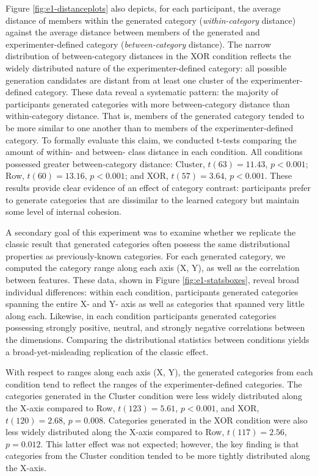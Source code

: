 \documentclass[12pt]{article}
\begin{document}
\begin{flushleft}
Figure \ref{fig:e1-distanceplots} also depicts, for each participant, the average distance of members within the generated category ({\em within-category} distance) against the average distance between members of the generated and experimenter-defined category ({\em between-category} distance). The narrow distribution of between-category distances in the XOR condition reflects the widely distributed nature of the experimenter-defined category: all possible generation candidates are distant from at least one cluster of the experimenter-defined category. These data reveal a systematic pattern: the majority of participants generated categories with more between-category distance than within-category distance. That is, members of the generated category tended to be more similar to one another than to members of the experimenter-defined category. To formally evaluate this claim, we conducted t-tests comparing the amount of within- and between- class distance in each condition. All conditions possessed greater between-category distance: Cluster, $t(63) = 11.43$, $p < 0.001$; Row, $t(60) = 13.16$, $p < 0.001$; and XOR, $t(57) = 3.64$, $p < 0.001$.  These results provide clear evidence of an effect of category contrast: participants prefer to generate categories that are dissimilar to the learned category but maintain some level of internal cohesion. 

A secondary goal of this experiment was to examine whether we replicate the classic result that generated categories often possess the same distributional properties as previously-known categories. For each generated category, we computed the category range along each axis (X, Y), as well as the correlation between features. These data, shown in Figure \ref{fig:e1-statsboxes}, reveal broad individual differences: within each condition, participants generated categories spanning the entire X- and Y- axis as well as categories that spanned very little along each. Likewise, in each condition participants generated categories possessing strongly positive, neutral, and strongly negative correlations between the dimensions. Comparing the distributional statistics between conditions yields a broad-yet-misleading replication of the classic effect. 

With respect to ranges along each axis (X, Y), the generated categories from each condition tend to reflect the ranges of the experimenter-defined categories. The categories generated in the Cluster condition were less widely distributed along the X-axis compared to Row, $t(123) = 5.61$, $p < 0.001$, and XOR, $t(120) = 2.68$, $p = 0.008$. Categories generated in the XOR condition were also less widely distributed along the X-axis compared to Row, $t(117) = 2.56$, $p = 0.012$. This latter effect was not expected; however, the key finding is that categories from the Cluster condition tended to be more tightly distributed along the X-axis.


\end{flushleft}
\end{document}

